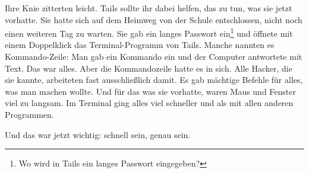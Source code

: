 Ihre Knie zitterten leicht.
Tails sollte ihr dabei helfen, das zu tun, was sie jetzt vorhatte.
Sie hatte sich auf dem Heimweg von der Schule entschlossen, nicht noch einen weiteren Tag zu warten.
Sie gab ein langes Passwort ein\footnote{Wo wird in Tails ein langes Passwort eingegeben?} und öffnete  mit einem Doppelklick das Terminal-Programm von Tails.
Manche nannten es Kommando-Zeile: Man gab ein Kommando ein und der Computer antwortete mit Text.
Das war alles.
Aber die Kommandozeile hatte es in sich.
Alle Hacker, die sie kannte, arbeiteten fast ausschließlich damit.
Es gab mächtige Befehle für alles, was man machen wollte.
Und für das was sie vorhatte, waren Maus und Fenster viel zu langsam.
Im Terminal ging alles viel schneller und  als mit allen anderen Programmen.

Und das war jetzt wichtig: schnell sein, genau sein.
